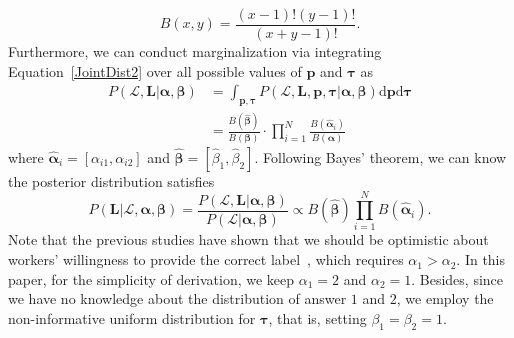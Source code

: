 \documentclass{article}
\begin{document}
\begin{equation}
B(x,y)=\frac{(x-1)!(y-1)!}{(x+y-1)!}.
\end{equation}
Furthermore, we can conduct marginalization via integrating Equation~\ref{JointDist2} over all possible values of $\bm{p}$ and $\bm{\tau}$ as
\begin{equation}
\begin{split}
P(\mathcal{L},\bm{L}|\bm{\alpha}, \bm{\beta})&=\int_{\bm{p}, \bm{\tau}} P(\mathcal{L},\bm{L},\bm{p}, \bm{\tau}|\bm{\alpha}, \bm{\beta})\mathrm{d}\bm{p}\mathrm{d} \bm{\tau}\\
&=\frac{B(\hat{\bm{\beta}})}{B(\bm{\beta})}\cdot \prod_{i=1}^{N}\frac{B(\hat{\bm{\alpha}}_{i})}{B(\bm{\alpha})}
\end{split}
\end{equation}
where $\hat{\bm{\alpha}}_i=[\alpha_{i1},\alpha_{i2}]$ and $\hat{\bm{\beta}}=[\hat{\beta}_1,\hat{\beta}_2]$. Following Bayes' theorem, we can know the posterior distribution satisfies
\begin{equation}
\label{PostDist}
P(\bm{L}|\mathcal{L}, \bm{\alpha}, \bm{\beta})=\frac{P(\mathcal{L},\bm{L}|\bm{\alpha}, \bm{\beta})}{P(\mathcal{L}|\bm{\alpha}, \bm{\beta})}\propto B(\hat{\bm{\beta}})\prod_{i=1}^{N}B(\hat{\bm{\alpha}}_{i}). 
\end{equation}
Note that the previous studies have shown that we should be optimistic about workers' willingness to provide the correct label~\cite{chen2015statistical}, which requires $\alpha_1>\alpha_2$.
In this paper, for the simplicity of derivation, we keep $\alpha_1=2$ and $\alpha_2=1$.
Besides, since we have no knowledge about the distribution of answer $1$ and $2$, we employ the non-informative uniform distribution for $\bm{\tau}$, that is, setting $\beta_1=\beta_2=1$.
\end{document}
